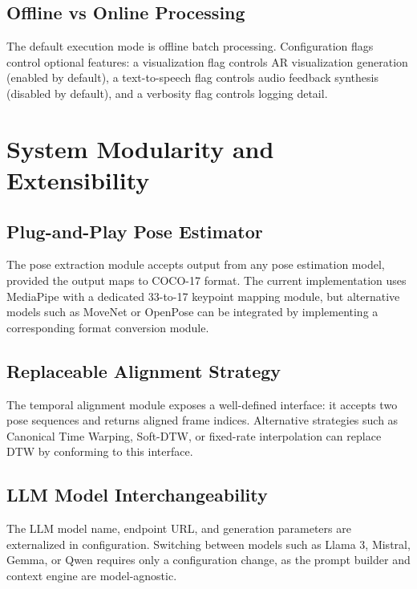 \subsection{Offline vs Online Processing}

The default execution mode is offline batch processing. Configuration flags control optional features: a visualization flag controls AR visualization generation (enabled by default), a text-to-speech flag controls audio feedback synthesis (disabled by default), and a verbosity flag controls logging detail.


\section{System Modularity and Extensibility}

\subsection{Plug-and-Play Pose Estimator}

The pose extraction module accepts output from any pose estimation model, provided the output maps to COCO-17 format. The current implementation uses MediaPipe with a dedicated 33-to-17 keypoint mapping module, but alternative models such as MoveNet or OpenPose can be integrated by implementing a corresponding format conversion module.

\subsection{Replaceable Alignment Strategy}

The temporal alignment module exposes a well-defined interface: it accepts two pose sequences and returns aligned frame indices. Alternative strategies such as Canonical Time Warping, Soft-DTW, or fixed-rate interpolation can replace DTW by conforming to this interface.

\subsection{LLM Model Interchangeability}

The LLM model name, endpoint URL, and generation parameters are externalized in configuration. Switching between models such as Llama 3, Mistral, Gemma, or Qwen requires only a configuration change, as the prompt builder and context engine are model-agnostic.


